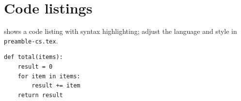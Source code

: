 \section{Code listings}
 shows a code listing with syntax highlighting; adjust the language and style in \texttt{preamble-cs.tex}.

\begin{lstlisting}[caption={A sample code listing.},label={lst:sample}]
def total(items):
    result = 0
    for item in items:
        result += item
    return result
\end{lstlisting}
